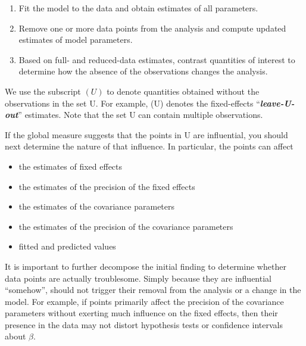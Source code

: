 \documentclass[12pt, a4paper]{report}
\theoremstyle{plain}
\theoremstyle{definition}
\theoremstyle{remark}
\begin{document}
		\begin{enumerate}
			\item Fit the model to the data and obtain estimates of all parameters.
			\item Remove one or more data points from the analysis and compute updated estimates of model parameters.
			\item Based on full- and reduced-data estimates, contrast quantities of interest to determine how the absence
			of the observations changes the analysis.
		\end{enumerate}
		We use the subscript $(U)$ to denote quantities obtained without the observations in the set U. For example,
		(U) denotes the fixed-effects “\textit{\textbf{leave-U-out}}” estimates. Note that the set U can contain multiple observations.
		
		
		If the global measure suggests that the points in U are influential, you should next determine the nature of
		that influence. In particular, the points can affect
		\begin{itemize}
			\item the estimates of fixed effects
			\item the estimates of the precision of the fixed effects
			\item the estimates of the covariance parameters
			\item the estimates of the precision of the covariance parameters
			\item fitted and predicted values
		\end{itemize}
		
		It is important to further decompose the initial finding to determine whether data points are actually troublesome.
		Simply because they are influential “somehow”, should not trigger their removal from the analysis or
		a change in the model. For example, if points primarily affect the precision of the covariance parameters
		without exerting much influence on the fixed effects, then their presence in the data may not distort hypothesis
		tests or confidence intervals about $\beta$.

		
		
\end{document}
